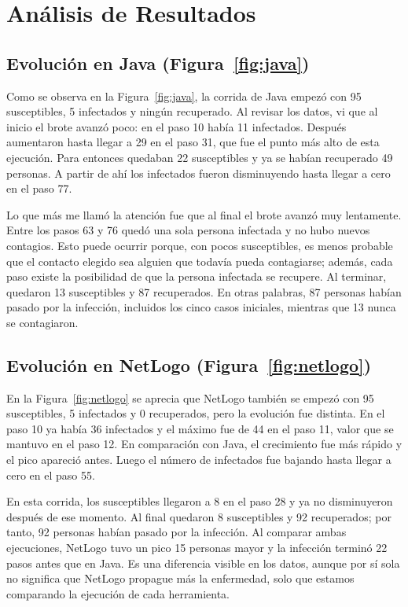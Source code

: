 \documentclass[11pt,a4paper]{article}
\begin{document}
\FloatBarrier
\section{Análisis de Resultados}
\setlength{\parskip}{0.55em}

\subsection{Evolución en Java (Figura~\ref{fig:java})}
Como se observa en la Figura~\ref{fig:java}, la corrida de Java empezó con 95 susceptibles, 5 infectados y ningún recuperado. Al revisar los datos, vi que al inicio el brote avanzó poco: en el paso 10 había 11 infectados. Después aumentaron hasta llegar a 29 en el paso 31, que fue el punto más alto de esta ejecución. Para entonces quedaban 22 susceptibles y ya se habían recuperado 49 personas. A partir de ahí los infectados fueron disminuyendo hasta llegar a cero en el paso 77.

Lo que más me llamó la atención fue que al final el brote avanzó muy lentamente. Entre los pasos 63 y 76 quedó una sola persona infectada y no hubo nuevos contagios. Esto puede ocurrir porque, con pocos susceptibles, es menos probable que el contacto elegido sea alguien que todavía pueda contagiarse; además, cada paso existe la posibilidad de que la persona infectada se recupere. Al terminar, quedaron 13 susceptibles y 87 recuperados. En otras palabras, 87 personas habían pasado por la infección, incluidos los cinco casos iniciales, mientras que 13 nunca se contagiaron.

\subsection{Evolución en NetLogo (Figura~\ref{fig:netlogo})}
En la Figura~\ref{fig:netlogo} se aprecia que NetLogo también se empezó con 95 susceptibles, 5 infectados y 0 recuperados, pero la evolución fue distinta. En el paso 10 ya había 36 infectados y el máximo fue de 44 en el paso 11, valor que se mantuvo en el paso 12. En comparación con Java, el crecimiento fue más rápido y el pico apareció antes. Luego el número de infectados fue bajando hasta llegar a cero en el paso 55.

En esta corrida, los susceptibles llegaron a 8 en el paso 28 y ya no disminuyeron después de ese momento. Al final quedaron 8 susceptibles y 92 recuperados; por tanto, 92 personas habían pasado por la infección. Al comparar ambas ejecuciones, NetLogo tuvo un pico 15 personas mayor y la infección terminó 22 pasos antes que en Java. Es una diferencia visible en los datos, aunque por sí sola no significa que NetLogo propague más la enfermedad, solo que estamos comparando la ejecución de cada herramienta.
\end{document}
